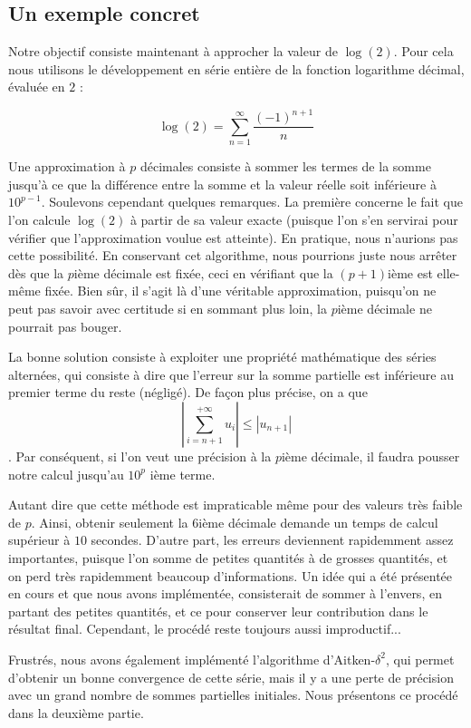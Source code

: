 \documentclass{article}
\begin{document}
\subsection{Un exemple concret}
Notre objectif consiste maintenant à approcher la valeur de $\log(2)$. Pour cela nous utilisons le développement en série entière de la fonction logarithme décimal, évaluée en $2$ :

\[\log(2)=\sum_{n=1}^{\infty}\frac{(-1)^{n+1}}{n}\]

Une approximation à $p$ décimales consiste à sommer les termes de la somme jusqu'à ce que la différence entre la somme et la valeur réelle soit inférieure à $10^{p-1}$. Soulevons cependant quelques remarques. La première concerne le fait que l'on calcule $\log(2)$ à partir de sa valeur exacte (puisque l'on s'en servirai pour vérifier que l'approximation voulue est atteinte). En pratique, nous n'aurions pas cette possibilité. En conservant cet algorithme, nous pourrions juste nous arrêter dès que la $p$ième décimale est fixée, ceci en vérifiant que la $(p+1)$ième est elle-même fixée. Bien sûr, il s'agit là d'une véritable approximation, puisqu'on ne peut pas savoir avec certitude si en sommant plus loin, la $p$ième décimale ne pourrait pas bouger.\medskip

La bonne solution consiste à exploiter une propriété mathématique des séries alternées, qui consiste à dire que l'erreur sur la somme partielle est inférieure au premier terme du reste (négligé). De façon plus précise, on a que \[|\sum_{i=n+1}^{+\infty}u_i|\le |u_{n+1}|\]. Par conséquent, si l'on veut une précision à la $p$ième décimale, il faudra pousser notre calcul jusqu'au $10^p$ ième terme.\medskip

Autant dire que cette méthode est impraticable même pour des valeurs très faible de $p$. Ainsi, obtenir seulement la $6$ième décimale demande un temps de calcul supérieur à $10$ secondes. D'autre part, les erreurs deviennent rapidemment assez importantes, puisque l'on somme de petites quantités à de grosses quantités, et on perd très rapidemment beaucoup d'informations. Un idée qui a été présentée en cours et que nous avons implémentée, consisterait de sommer à l'envers, en partant des petites quantités, et ce pour conserver leur contribution dans le résultat final. Cependant, le procédé reste toujours aussi improductif...\medskip

Frustrés, nous avons également implémenté l'algorithme d'Aitken-$\delta^2$, qui permet d'obtenir un bonne convergence de cette série, mais il y a une perte de précision avec un grand nombre de sommes partielles initiales. Nous présentons ce procédé dans la deuxième partie.
\end{document}
